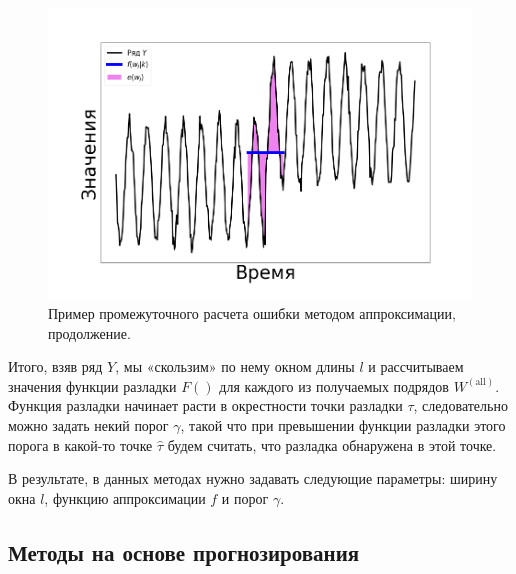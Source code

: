 \documentclass[%
12pt,
master,  %
natbib,      %
subf,        %
substylefile = spbu.rtx,
href,        %
colorlinks,  %
]{disser}
\begin{document}
\begin{figure}[!hhh]
	\begin{center}
		\includegraphics[width=12cm]{approaches_second_3_ru}
	\end{center}
	\vspace{-5mm}\caption{Пример промежуточного расчета ошибки методом аппроксимации, продолжение.}
	\label{fig:approximation_example_2}
\end{figure}


Итого, взяв ряд $Y$, мы «скользим» по нему окном длины $l$ и рассчитываем значения функции разладки $F()$ для каждого из получаемых подрядов $W^{\mathrm{(all)}}$. Функция разладки начинает расти в окрестности точки разладки $\tau$, следовательно можно задать некий порог $\gamma$, такой что при превышении функции разладки этого порога в какой-то точке $\hat{\tau}$ будем считать, что разладка обнаружена в этой точке.

В результате, в данных методах нужно задавать следующие параметры: ширину окна $l$, функцию аппроксимации $f$ и порог $\gamma$.

\subsection{Методы на основе прогнозирования}
\end{document}

